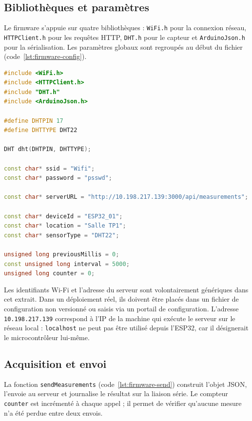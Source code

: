 \documentclass[11pt,a4paper]{article}
\begin{document}
\subsection{Bibliothèques et paramètres}

Le firmware s'appuie sur quatre bibliothèques : \texttt{WiFi.h} pour la connexion réseau,
\texttt{HTTPClient.h} pour les requêtes HTTP, \texttt{DHT.h} pour le capteur et
\texttt{ArduinoJson.h} pour la sérialisation. Les paramètres globaux sont regroupés au début
du fichier (code~\ref{lst:firmware-config}).

\begin{lstlisting}[language=C++,firstnumber=1,
  caption={Configuration et paramètres du firmware (\texttt{esp32/main.c}).},
  label={lst:firmware-config}]
#include <WiFi.h>
#include <HTTPClient.h>
#include "DHT.h"
#include <ArduinoJson.h>

#define DHTPIN 17
#define DHTTYPE DHT22

DHT dht(DHTPIN, DHTTYPE);

const char* ssid = "Wifi";
const char* password = "psswd";

const char* serverURL = "http://10.198.217.139:3000/api/measurements";

const char* deviceId = "ESP32_01";
const char* location = "Salle TP1";
const char* sensorType = "DHT22";

unsigned long previousMillis = 0;
const unsigned long interval = 5000;
unsigned long counter = 0;
\end{lstlisting}

Les identifiants Wi-Fi et l'adresse du serveur sont volontairement génériques dans cet extrait.
Dans un déploiement réel, ils doivent être placés dans un fichier de configuration non versionné
ou saisis via un portail de configuration. L'adresse \texttt{10.198.217.139} correspond à l'IP
de la machine qui exécute le serveur sur le réseau local : \texttt{localhost} ne peut pas être
utilisé depuis l'ESP32, car il désignerait le microcontrôleur lui-même.

\subsection{Acquisition et envoi}

La fonction \texttt{sendMeasurements} (code~\ref{lst:firmware-send}) construit l'objet JSON,
l'envoie au serveur et journalise le résultat sur la liaison série. Le compteur
\texttt{counter} est incrémenté à chaque appel ; il permet de vérifier qu'aucune mesure n'a
été perdue entre deux envois.
\end{document}
